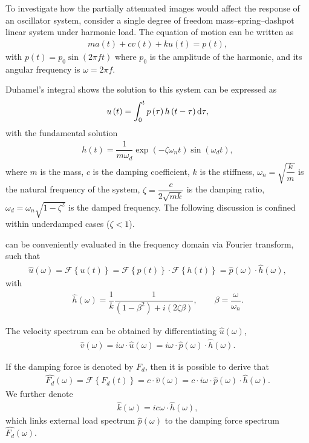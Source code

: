 To investigate how the partially attenuated images would affect the response of an oscillator system, consider a single degree of freedom mass--spring--dashpot linear system under harmonic load. The equation of motion can be written as
\begin{gather}
ma\left(t\right)+cv\left(t\right)+ku\left(t\right)=p\left(t\right),
\end{gather}
with $p\left(t\right)=p_0\sin\left(2\pi{}ft\right)$ where $p_0$ is the amplitude of the harmonic, and its angular frequency is $\omega=2\pi{}f$.

Duhamel's integral shows the solution to this system can be expressed as
\begin{gather}\label{eq:duhamel}
u\left(t\right)=\int_{0}^{t}p\left(\tau\right)h\left(t-\tau\right)\mathrm{d}\tau,
\end{gather}
with the fundamental solution
\begin{gather}
h\left(t\right)=\dfrac{1}{m\omega_d}\exp\left(-\zeta\omega_nt\right)\sin\left(\omega_dt\right),
\end{gather}
where $m$ is the mass, $c$ is the damping coefficient, $k$ is the stiffness, $\omega_n=\sqrt{\dfrac{k}{m}}$ is the natural frequency of the system, $\zeta=\dfrac{c}{2\sqrt{mk}}$ is the damping ratio, $\omega_d=\omega_n\sqrt{1-\zeta^2}$ is the damped frequency. The following discussion is confined within underdamped cases ($\zeta<1$).

 can be conveniently evaluated in the frequency domain via Fourier transform, such that
\begin{gather}
\hat{u}\left(\omega\right)=\mathscr{F}\left\{u\left(t\right)\right\}=\mathscr{F}\left\{p\left(t\right)\right\}\cdot\mathscr{F}\left\{h\left(t\right)\right\}=\hat{p}\left(\omega\right)\cdot\hat{h}\left(\omega\right),
\end{gather}
with
\begin{gather}
\hat{h}\left(\omega\right)=\dfrac{1}{k}\dfrac{1}{\left(1-\beta^2\right)+i\left(2\zeta\beta\right)},\qquad\beta=\dfrac{\omega}{\omega_n}.
\end{gather}

The velocity spectrum can be obtained by differentiating $\hat{u}\left(\omega\right)$,
\begin{gather}
\hat{v}\left(\omega\right)=i\omega\cdot{}\hat{u}\left(\omega\right)=i\omega\cdot{}\hat{p}\left(\omega\right)\cdot\hat{h}\left(\omega\right).
\end{gather}

If the damping force is denoted by $F_d$, then it is possible to derive that
\begin{gather}
\hat{F_d}\left(\omega\right)=\mathscr{F}\left\{F_d\left(t\right)\right\}=c\cdot{}\hat{v}\left(\omega\right)=c\cdot{}i\omega\cdot{}\hat{p}\left(\omega\right)\cdot\hat{h}\left(\omega\right).
\end{gather}
We further denote
\begin{gather}
\hat{k}\left(\omega\right)=ic\omega\cdot\hat{h}\left(\omega\right),
\end{gather}
which links external load spectrum $\hat{p}\left(\omega\right)$ to the damping force spectrum $\hat{F_d}\left(\omega\right)$.

